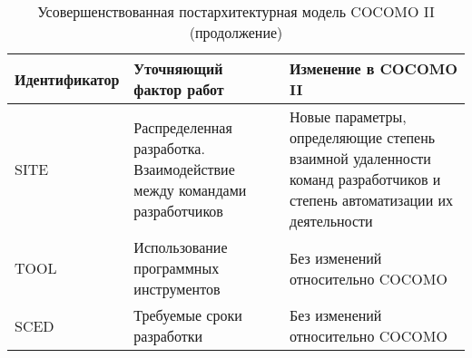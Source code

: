 \begin{table}[H]
	\caption{Усовершенствованная постархитектурная модель COCOMO II (продолжение)}
	\label{cocomoII}
	\begin{center}
		\begin{tabular}{| p{4 cm} | p{4 cm} | p{8.5 cm} |} 
			\hline
			\textbf{Идентификатор} & \textbf{Уточняющий фактор работ} & \textbf{Изменение в COCOMO II} \\
			\hline
			SITE & Распределенная разработка. Взаимодействие между командами разработчиков  & Новые параметры, определяющие степень взаимной удаленности команд разработчиков и степень автоматизации их деятельности \\
			\hline
			TOOL & Использование программных инструментов & Без изменений относительно COCOMO \\
			\hline
			SCED & Требуемые сроки разработки & Без изменений относительно COCOMO \\
			\hline
		\end{tabular}
	\end{center}
\end{table}
